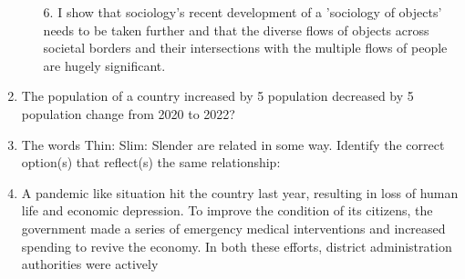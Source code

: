 \documentclass[12pt]{article}
\theoremstyle{remark}
\begin{document}
\begin{enumerate}
\begin{enumerate}
\item[6.] I show that sociology’s recent development of a 'sociology of objects' needs to
be taken further and that the diverse flows of objects across societal borders and
their intersections with the multiple flows of people are hugely significant. 
\end{enumerate}
\begin{enumerate}  \end{enumerate}
\hfill{}
\item The population of a country increased by 5%
population decreased by 5%
population change from 2020 to 2022? 
\begin{enumerate}  \end{enumerate}
\hfill{}
\item The words Thin: Slim: Slender are related in some way. Identify the correct
option(s) that reflect(s) the same relationship: 
\begin{enumerate}  \end{enumerate}
\hfill{}
\item A pandemic like situation hit the country last year, resulting in loss of human life
and economic depression. To improve the condition of its citizens, the government
made a series of emergency medical interventions and increased spending to revive
the economy. In both these efforts, district administration authorities were actively

\end{enumerate}
\end{document}
